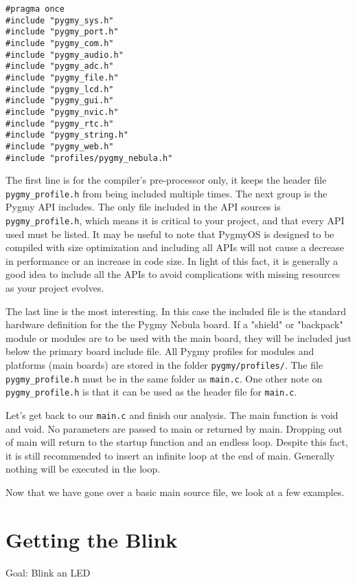 \documentclass{article}
\begin{document}
\begin{lstlisting}
#pragma once
#include "pygmy_sys.h"
#include "pygmy_port.h"
#include "pygmy_com.h"
#include "pygmy_audio.h"
#include "pygmy_adc.h"
#include "pygmy_file.h"
#include "pygmy_lcd.h"
#include "pygmy_gui.h"
#include "pygmy_nvic.h"
#include "pygmy_rtc.h"
#include "pygmy_string.h"
#include "pygmy_web.h"
#include "profiles/pygmy_nebula.h"
\end{lstlisting}

The first line is for the compiler's pre-processor only, it keeps the header file \verb|pygmy_profile.h| from being included multiple times. The next group is the Pygmy API includes. The only file included in the API sources is \verb|pygmy_profile.h|, which means it is critical to your project, and that every API used must be listed. It may be useful to note that PygmyOS is designed to be compiled with size optimization and including all APIs will not cause a decrease in performance or an increase in code size. In light of this fact, it is generally a good idea to include all the APIs to avoid complications with missing resources as your project evolves.

The last line is the most interesting. In this case the included file is the standard hardware definition for the the Pygmy Nebula board. If a "shield" or "backpack" module or modules are to be used with the main board, they will be included just below the primary board include file. All Pygmy profiles for modules and platforms (main boards) are stored in the folder \verb|pygmy/profiles/|. The file \verb|pygmy_profile.h| must be in the same folder as \verb|main.c|. One other note on \verb|pygmy_profile.h| is that it can be used as the header file for \verb|main.c|.

Let's get back to our \verb|main.c| and finish our analysis. The main function is void and void. No parameters are passed to main or returned by main. Dropping out of main will return to the startup function and an endless loop. Despite this fact, it is still recommended to insert an infinite loop at the end of main. Generally nothing will be executed in the loop.

Now that we have gone over a basic main source file, we look at a few examples.

\section{Getting the Blink}

Goal: Blink an LED
\end{document}
